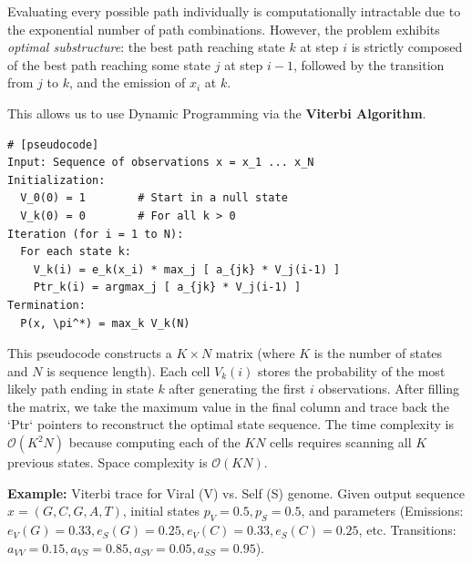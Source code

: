 Evaluating every possible path individually is computationally intractable due to the exponential number of path combinations. However, the problem exhibits \textit{optimal substructure}: the best path reaching state $k$ at step $i$ is strictly composed of the best path reaching some state $j$ at step $i-1$, followed by the transition from $j$ to $k$, and the emission of $x_i$ at $k$.

This allows us to use Dynamic Programming via the \textbf{Viterbi Algorithm}.

\begin{verbatim}
# [pseudocode]
Input: Sequence of observations x = x_1 ... x_N
Initialization:
  V_0(0) = 1        # Start in a null state
  V_k(0) = 0        # For all k > 0
Iteration (for i = 1 to N):
  For each state k:
    V_k(i) = e_k(x_i) * max_j [ a_{jk} * V_j(i-1) ]
    Ptr_k(i) = argmax_j [ a_{jk} * V_j(i-1) ]
Termination:
  P(x, \pi^*) = max_k V_k(N)
\end{verbatim}

This pseudocode constructs a $K \times N$ matrix (where $K$ is the number of states and $N$ is sequence length). Each cell $V_k(i)$ stores the probability of the most likely path ending in state $k$ after generating the first $i$ observations. After filling the matrix, we take the maximum value in the final column and trace back the `Ptr` pointers to reconstruct the optimal state sequence.
\sta The time complexity is $\mathcal{O}(K^2N)$ because computing each of the $KN$ cells requires scanning all $K$ previous states. Space complexity is $\mathcal{O}(KN)$.

\textbf{Example:} Viterbi trace for Viral (V) vs. Self (S) genome.
Given output sequence $x = (G, C, G, A, T)$, initial states $p_V = 0.5, p_S = 0.5$, and parameters (Emissions: $e_V(G)=0.33, e_S(G)=0.25, e_V(C)=0.33, e_S(C)=0.25$, etc. Transitions: $a_{VV}=0.15, a_{VS}=0.85, a_{SV}=0.05, a_{SS}=0.95$).

